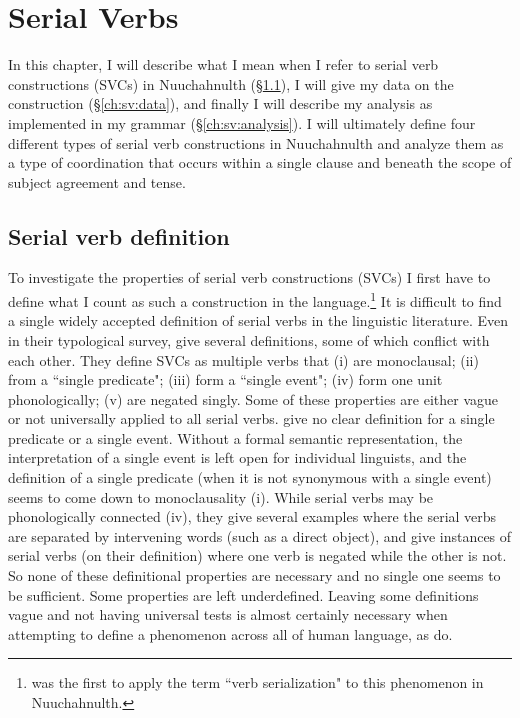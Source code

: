 \chapter{Serial Verbs} \label{ch:sv}

In this chapter, I will describe what I mean when I refer to serial verb constructions (SVCs) in Nuuchahnulth (\S\ref{ch:sv:def}), I will give my data on the construction (\S\ref{ch:sv:data}), and finally I will describe my analysis as implemented in my grammar (\S\ref{ch:sv:analysis}). I will ultimately define four different types of serial verb constructions in Nuuchahnulth and analyze them as a type of coordination that occurs within a single clause and beneath the scope of subject agreement and tense.

\section{Serial verb definition} \label{ch:sv:def}

To investigate the properties of serial verb constructions (SVCs) I first have to define what I count as such a construction in the language.\footnote{\citet{jacobsen1993} was the first to apply the term ``verb serialization" to this phenomenon in Nuuchahnulth.}  It is difficult to find a single widely accepted definition of serial verbs in the linguistic literature. Even in their typological survey, \citet{aikhenvalddixon2006} give several definitions, some of which conflict with each other. They define SVCs as multiple verbs that (i) are monoclausal; (ii) from a ``single predicate"; (iii) form a ``single event"; (iv) form one unit phonologically; (v) are negated singly. Some of these properties are either vague or not universally applied to all serial verbs. \citeauthor{aikhenvalddixon2006} give no clear definition for a single predicate or a single event. Without a formal semantic representation, the interpretation of a single event is left open for individual linguists, and the definition of a single predicate (when it is not synonymous with a single event) seems to come down to monoclausality (i). While serial verbs may be phonologically connected (iv), they give several examples where the serial verbs are separated by intervening words (such as a direct object), and give instances of serial verbs (on their definition) where one verb is negated while the other is not. So none of these definitional properties are necessary and no single one seems to be sufficient. Some properties are left underdefined. Leaving some definitions vague and not having universal tests is almost certainly necessary when attempting to define a phenomenon across all of human language, as \citeauthor{aikhenvalddixon2006} do.

